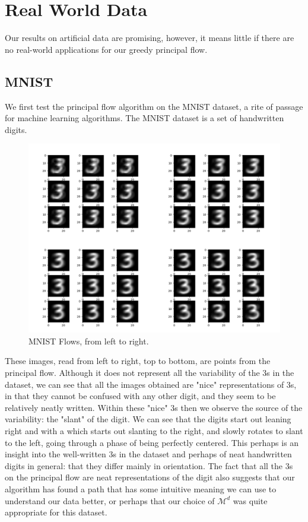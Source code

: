 \documentclass[12pt]{report}
\begin{document}
\section{Real World Data}

Our results on artificial data are promising, however, it means little
if there are no real-world applications for our greedy principal flow.

\subsection{MNIST}
 
We first test the principal flow algorithm on the MNIST dataset, a rite of passage
for machine learning algorithms. The MNIST dataset is a set of handwritten digits.  

\begin{figure}[h]
    \begin{center}
        \includegraphics[scale=0.2]{main_mnist.png}
        \caption{MNIST Flows, from left to right.}
        \label{fig:mnistflows}
    \end{center}
\end{figure}

These images, read from left to right, top to bottom, are points from the principal 
flow. Although it does not represent all the variability of the 3s in the dataset, 
we can see that all the images obtained are "nice" representations of 3s, 
in that they cannot be confused with any other digit, and they seem to be relatively
neatly written. Within these "nice" 3s then we observe the source of the variability:
the "slant" of the digit.
We can see that the digits start out leaning right and with a 
which starts out slanting to the right, and slowly rotates
to slant to the left, going through a phase of being perfectly centered. 
This perhaps is an insight into the well-written 3s in the dataset and perhaps 
of neat handwritten digits in general: that they differ mainly in orientation. 
The fact that all the 3s on the principal flow are neat representations of the digit
also suggests that our algorithm has found a path that has some intuitive meaning
we can use to understand our data better, or perhaps that our choice of $\mathcal{M}^d$
was quite appropriate for this dataset.
\end{document}

